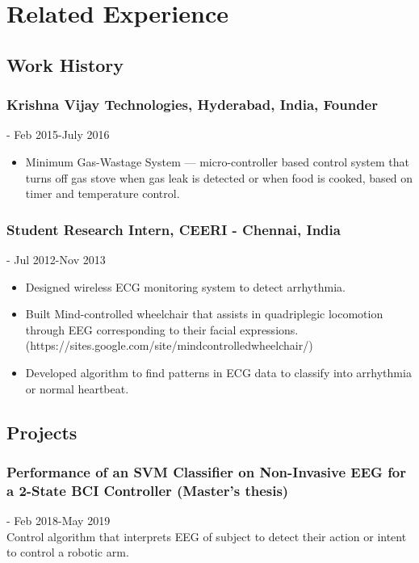 \documentclass{article}
\begin{document}
\section{Related Experience}
\subsection{Work History}

\subsubsection{Krishna Vijay Technologies, Hyderabad, India, Founder} \hfill - Feb 2015-July 2016
\begin{itemize}
    \item Minimum Gas-Wastage System --- micro-controller based control system that turns off gas stove when gas leak is detected or when food is cooked, based on timer and temperature control.
\end{itemize}
    
\subsubsection{Student Research Intern, CEERI - Chennai, India} \hfill - Jul 2012-Nov 2013
\begin{itemize}
    \item Designed wireless ECG monitoring system to detect arrhythmia.
    \item Built Mind-controlled wheelchair that assists in quadriplegic locomotion through EEG corresponding to their facial expressions.
    (https://sites.google.com/site/mindcontrolledwheelchair/)
    \item Developed algorithm to find patterns in ECG data to classify into arrhythmia or normal heartbeat.
\end{itemize}


\subsection{Projects}
\subsubsection{Performance of an SVM Classifier on Non-Invasive EEG for a 2-State BCI Controller (Master's thesis)} \hfill - Feb 2018-May 2019\\
Control algorithm that interprets EEG of subject to detect their action or intent to control a robotic arm.\\
\end{document}
